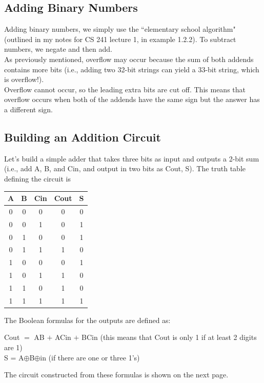 \documentclass{report}
\begin{document}
\subsection{Adding Binary Numbers}
Adding binary numbers, we simply use the ``elementary school algorithm" (outlined in my notes for CS 241 lecture 1, in example 1.2.2). To subtract numbers, we negate and then add.\\
As previously mentioned, overflow may occur because the sum of both addends contains more bits (i.e., adding two 32-bit strings can yield a 33-bit string, which is overflow!).\\
 Overflow cannot occur, so the leading extra bits are cut off. This means that overflow occurs when both of the addends have the same sign but the answer has a different sign.
\subsection{Building an Addition Circuit}
Let's build a simple adder that takes three bits as input and outputs a 2-bit sum (i.e., add A, B, and Cin, and output in two bits as Cout, S).
The truth table defining the circuit is
\begin{center}
\begin{tabular}{ c c c | c c }
A & B & Cin & Cout & S \\ \hline
0 & 0 & 0 & 0 & 0 \\
0 & 0 & 1 & 0 & 1 \\
0 & 1 & 0 & 0 & 1 \\
0 & 1 & 1 & 1 & 0 \\ \hline
1 & 0 & 0 & 0 & 1 \\
1 & 0 & 1 & 1 & 0 \\
1 & 1 & 0 & 1 & 0 \\
1 & 1 & 1 & 1 & 1 \\
\end{tabular}
\end{center}
The Boolean formulas for the outputs are defined as:
\begin{center}
Cout $=$ AB $+$ ACin $+$ BCin (this means that Cout is only 1 if at least 2 digits are 1) \\
S = A$\oplus$B$\oplus$in (if there are one or three 1's)
\end{center}
The circuit constructed from these formulas is shown on the next page.
\end{document}
